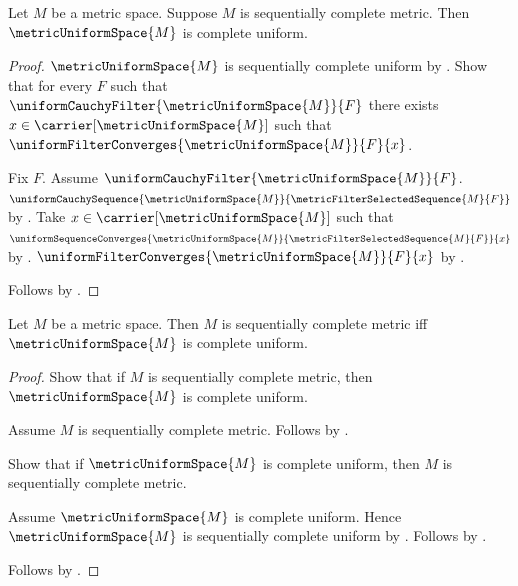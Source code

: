 \begin{theorem}\label{sequentially_complete_metric_implies_complete_uniform}
    Let $M$ be a metric space.
    Suppose $M$ is sequentially complete metric.
    Then $\metricUniformSpace{M}$ is complete uniform.
\end{theorem}
\begin{proof}
    $\metricUniformSpace{M}$ is sequentially complete uniform
        by .
    Show that for every $F$ such that
        $\uniformCauchyFilter{\metricUniformSpace{M}}{F}$ there exists
        $x\in\carrier[\metricUniformSpace{M}]$ such that
        $\uniformFilterConverges{\metricUniformSpace{M}}{F}{x}$.
    \begin{subproof}
        Fix $F$.
        Assume $\uniformCauchyFilter{\metricUniformSpace{M}}{F}$.
        $\uniformCauchySequence{\metricUniformSpace{M}}
            {\metricFilterSelectedSequence{M}{F}}$
            by .
        Take $x\in\carrier[\metricUniformSpace{M}]$ such that
            $\uniformSequenceConverges{\metricUniformSpace{M}}
                {\metricFilterSelectedSequence{M}{F}}{x}$
            by .
        $\uniformFilterConverges{\metricUniformSpace{M}}{F}{x}$
            by .
    \end{subproof}
    Follows by .
\end{proof}

\begin{theorem}\label{metric_uniform_completeness_iff}
    Let $M$ be a metric space.
    Then $M$ is sequentially complete metric iff
        $\metricUniformSpace{M}$ is complete uniform.
\end{theorem}
\begin{proof}
    Show that if $M$ is sequentially complete metric, then
        $\metricUniformSpace{M}$ is complete uniform.
    \begin{subproof}
        Assume $M$ is sequentially complete metric.
        Follows by
            .
    \end{subproof}
    Show that if $\metricUniformSpace{M}$ is complete uniform, then
        $M$ is sequentially complete metric.
    \begin{subproof}
        Assume $\metricUniformSpace{M}$ is complete uniform.
        Hence $\metricUniformSpace{M}$ is sequentially complete uniform
            by .
        Follows by .
    \end{subproof}
    Follows by \auto.
\end{proof}
